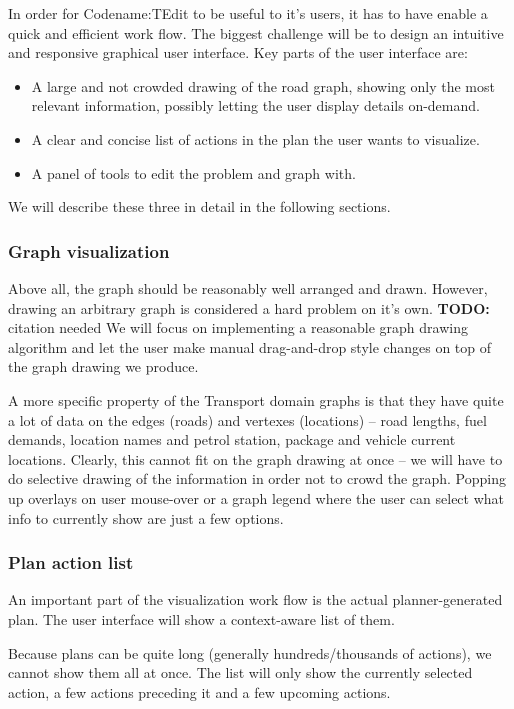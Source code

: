 \documentclass[10pt,a4paper,oneside]{article}
\newcommand{\TODO}[1]{{\textbf{TODO:} #1}} %
\newcommand{\pname}{Codename:TEdit } %
\begin{document}
In order for \pname to be useful to it's users, it has to have enable a quick and efficient work flow.
The biggest challenge will be to design an intuitive and responsive graphical user interface.
Key parts of the user interface are:
\begin{itemize}
\item A large and not crowded drawing of the road graph, showing only the most relevant information, possibly letting the user display details on-demand.
\item A clear and concise list of actions in the plan the user wants to visualize.
\item A panel of tools to edit the problem and graph with.
\end{itemize}

We will describe these three in detail in the following sections.

\subsubsection{Graph visualization} \label{graphviz}

Above all, the graph should be reasonably well arranged and drawn. However, drawing an arbitrary graph is considered a hard problem on it's own. \TODO citation needed
We will focus on implementing a reasonable graph drawing algorithm and let the user make manual drag-and-drop style changes on top of the graph drawing we produce.

A more specific property of the Transport domain graphs is that they have quite a lot of data on the edges (roads) and vertexes (locations) -- road lengths, fuel demands, location names and petrol station, package and vehicle current locations.
Clearly, this cannot fit on the graph drawing at once -- we will have to do selective drawing of the information in order
not to crowd the graph.
Popping up overlays on user mouse-over
or a graph legend where the user can select what info to currently show are just a few options.

\subsubsection{Plan action list}

An important part of the visualization work flow is the actual planner-generated plan.
The user interface will show a context-aware list of them.

Because plans can be quite long (generally hundreds/thousands of actions),
we cannot show them all at once.
The list will only show the currently selected action, a few actions preceding it and a few upcoming actions.
\end{document}
